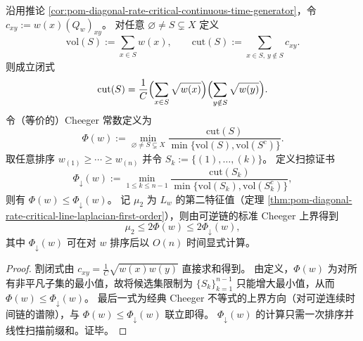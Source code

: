 \begin{corollary}\label{cor:pom-diagonal-rate-critical-cheeger-auditable-upper-bound}
沿用推论 \ref{cor:pom-diagonal-rate-critical-continuous-time-generator}，令 \(c_{xy}:=w(x)(Q_w)_{xy}\)。
对任意 \(\varnothing\ne S\subsetneq X\) 定义
\[
\mathrm{vol}(S):=\sum_{x\in S}w(x),\qquad
\mathrm{cut}(S):=\sum_{x\in S,\,y\notin S}c_{xy}.
\]
则成立闭式
\[
\mathrm{cut}(S)=\frac{1}{C}\Bigl(\sum_{x\in S}\sqrt{w(x)}\Bigr)\Bigl(\sum_{y\notin S}\sqrt{w(y)}\Bigr).
\]
令（等价的）Cheeger 常数定义为
\[
\Phi(w):=\min_{\varnothing\ne S\subsetneq X}\frac{\mathrm{cut}(S)}{\min\{\mathrm{vol}(S),\mathrm{vol}(S^c)\}}.
\]
取任意排序 \(w_{(1)}\ge\cdots\ge w_{(n)}\) 并令 \(S_k:=\{(1),\dots,(k)\}\)。
定义扫掠证书
\[
\Phi_{\downarrow}(w):=\min_{1\le k\le n-1}\frac{\mathrm{cut}(S_k)}{\min\{\mathrm{vol}(S_k),\mathrm{vol}(S_k^c)\}},
\]
则有 \(\Phi(w)\le \Phi_{\downarrow}(w)\)。
记 \(\mu_2\) 为 \(L_w\) 的第二特征值（定理 \ref{thm:pom-diagonal-rate-critical-line-laplacian-first-order}），则由可逆链的标准 Cheeger 上界得到
\[
\mu_2\le 2\Phi(w)\le 2\Phi_{\downarrow}(w),
\]
其中 \(\Phi_{\downarrow}(w)\) 可在对 \(w\) 排序后以 \(O(n)\) 时间显式计算。
\end{corollary}
\begin{proof}
割闭式由
\(
c_{xy}=\frac{1}{C}\sqrt{w(x)w(y)}
\)
直接求和得到。
由定义，\(\Phi(w)\) 为对所有非平凡子集的最小值，故将候选集限制为 \(\{S_k\}_{k=1}^{n-1}\) 只能增大最小值，从而 \(\Phi(w)\le \Phi_{\downarrow}(w)\)。
最后一式为经典 Cheeger 不等式的上界方向（对可逆连续时间链的谱隙），与 \(\Phi(w)\le \Phi_{\downarrow}(w)\) 联立即得。
\(\Phi_{\downarrow}(w)\) 的计算只需一次排序并线性扫描前缀和。证毕。
\end{proof}
